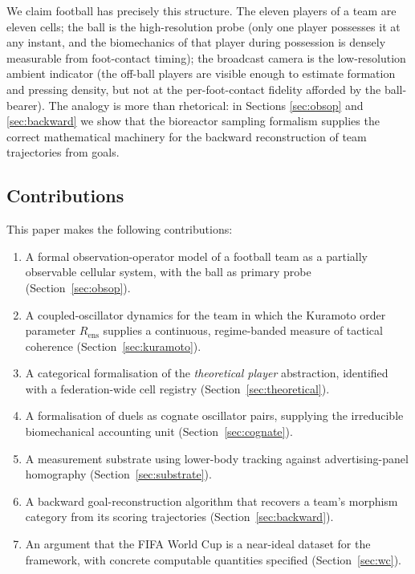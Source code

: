 \documentclass[11pt,twocolumn,a4paper]{article}
\theoremstyle{definition}
\theoremstyle{remark}
\newcommand{\Rens}{R_{\mathrm{ens}}}
\begin{document}
We claim football has precisely this structure. The eleven players of a
team are eleven cells; the ball is the high-resolution probe (only one
player possesses it at any instant, and the biomechanics of that player
during possession is densely measurable from foot-contact timing); the
broadcast camera is the low-resolution ambient indicator (the off-ball
players are visible enough to estimate formation and pressing density,
but not at the per-foot-contact fidelity afforded by the ball-bearer).
The analogy is more than rhetorical: in Sections \ref{sec:obsop} and
\ref{sec:backward} we show that the bioreactor sampling formalism
\citep{danckwerts1953} supplies the correct mathematical machinery for
the backward reconstruction of team trajectories from goals.

\subsection{Contributions}

This paper makes the following contributions:

\begin{enumerate}[leftmargin=1.4em]
  \item A formal observation-operator model of a football team as a
    partially observable cellular system, with the ball as primary
    probe (Section~\ref{sec:obsop}).
  \item A coupled-oscillator dynamics for the team in which the
    Kuramoto order parameter $\Rens$ supplies a continuous, regime-banded
    measure of tactical coherence (Section~\ref{sec:kuramoto}).
  \item A categorical formalisation of the \emph{theoretical player}
    abstraction, identified with a federation-wide cell registry
    (Section~\ref{sec:theoretical}).
  \item A formalisation of duels as cognate oscillator pairs, supplying
    the irreducible biomechanical accounting unit
    (Section~\ref{sec:cognate}).
  \item A measurement substrate using lower-body tracking against
    advertising-panel homography (Section~\ref{sec:substrate}).
  \item A backward goal-reconstruction algorithm that recovers a
    team's morphism category from its scoring trajectories
    (Section~\ref{sec:backward}).
  \item An argument that the FIFA World Cup is a near-ideal dataset
    for the framework, with concrete computable quantities specified
    (Section~\ref{sec:wc}).
\end{enumerate}
\end{document}
